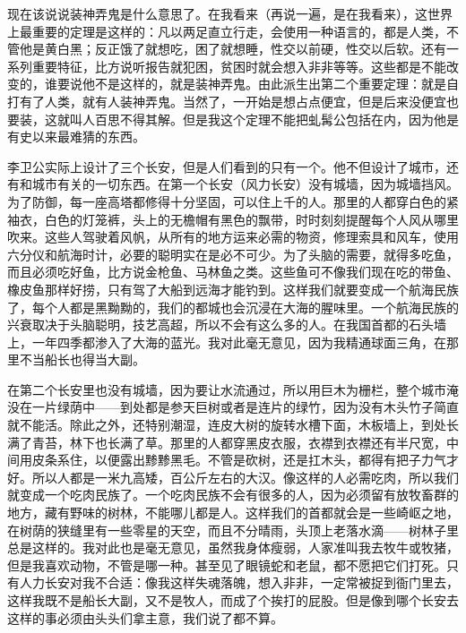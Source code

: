 现在该说说装神弄鬼是什么意思了。在我看来（再说一遍，是在我看来），这世界上最重要的定理是这样的：凡以两足直立行走，会使用一种语言的，都是人类，不管他是黄白黑；反正饿了就想吃，困了就想睡，性交以前硬，性交以后软。还有一系列重要特征，比方说听报告就犯困，贫困时就会想入非非等等。这些都是不能改变的，谁要说他不是这样的，就是装神弄鬼。由此派生出第二个重要定理：就是自打有了人类，就有人装神弄鬼。当然了，一开始是想占点便宜，但是后来没便宜也要装，这就叫人百思不得其解。但是我这个定理不能把虬髯公包括在内，因为他是有史以来最难猜的东西。 

李卫公实际上设计了三个长安，但是人们看到的只有一个。他不但设计了城市，还有和城市有关的一切东西。在第一个长安（风力长安）没有城墙，因为城墙挡风。为了防御，每一座高塔都修得十分坚固，可以住上千的人。那里的人都穿白色的紧袖衣，白色的灯笼裤，头上的无檐帽有黑色的飘带，时时刻刻提醒每个人风从哪里吹来。这些人驾驶着风帆，从所有的地方运来必需的物资，修理索具和风车，使用六分仪和航海时计，必要的聪明实在是必不可少。为了头脑的需要，就得多吃鱼，而且必须吃好鱼，比方说金枪鱼、马林鱼之类。这些鱼可不像我们现在吃的带鱼、橡皮鱼那样好捞，只有驾了大船到远海才能钓到。这样我们就要变成一个航海民族了，每个人都是黑黝黝的，我们的都城也会沉浸在大海的腥味里。一个航海民族的兴衰取决于头脑聪明，技艺高超，所以不会有这么多的人。在我国首都的石头墙上，一年四季都渗入了大海的蓝光。我对此毫无意见，因为我精通球面三角，在那里不当船长也得当大副。 

在第二个长安里也没有城墙，因为要让水流通过，所以用巨木为栅栏，整个城市淹没在一片绿荫中——到处都是参天巨树或者是连片的绿竹，因为没有木头竹子简直就不能活。除此之外，还特别潮湿，连皮大树的旋转水槽下面，木板墙上，到处长满了青苔，林下也长满了草。那里的人都穿黑皮衣服，衣襟到衣襟还有半尺宽，中间用皮条系住，以便露出黪黪黑毛。不管是砍树，还是扛木头，都得有把子力气才好。所以人都是一米九高矮，百公斤左右的大汉。像这样的人必需吃肉，所以我们就变成一个吃肉民族了。一个吃肉民族不会有很多的人，因为必须留有放牧畜群的地方，藏有野味的树林，不能哪儿都是人。这样我们的首都就会是一些崎岖之地，在树荫的狭缝里有一些零星的天空，而且不分晴雨，头顶上老落水滴——树林子里总是这样的。我对此也是毫无意见，虽然我身体瘦弱，人家准叫我去牧牛或牧猪，但是我喜欢动物，不管是哪一种。甚至见了眼镜蛇和老鼠，都不愿把它们打死。只有人力长安对我不合适：像我这样失魂落魄，想入非非，一定常被捉到衙门里去，这样我既不是船长大副，又不是牧人，而成了个挨打的屁股。但是像到哪个长安去这样的事必须由头头们拿主意，我们说了都不算。 

